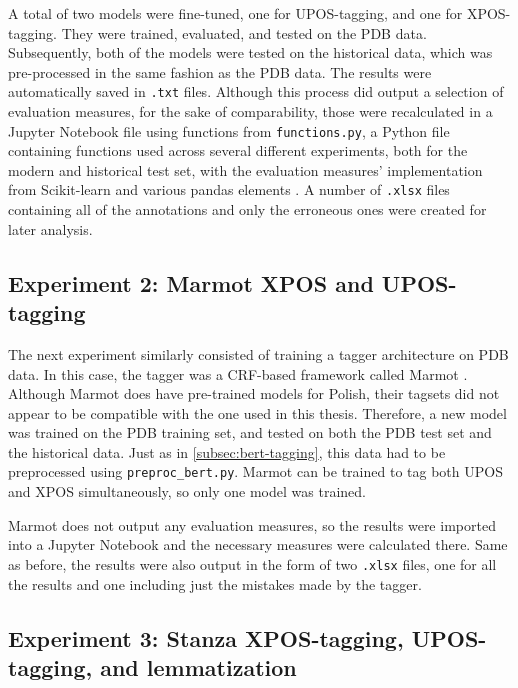 A total of two models were fine-tuned, one for UPOS-tagging, and one for XPOS-tagging. They were trained, evaluated, and tested on the PDB data. Subsequently, both of the models were tested on the historical data, which was pre-processed in the same fashion as the PDB data. The results were automatically saved in \texttt{.txt} files. Although this process did output a selection of evaluation measures, for the sake of comparability, those were recalculated in a Jupyter Notebook file using functions from \texttt{functions.py}, a Python file containing functions used across several different experiments, both for the modern and historical test set, with the evaluation measures' implementation from Scikit-learn and various pandas elements \citep{scikit-learn, reback2020pandas, mckinney-proc-scipy-2010}. A number of \texttt{.xlsx} files containing all of the annotations and only the erroneous ones were created for later analysis.  

\subsection{Experiment 2: Marmot XPOS and UPOS-tagging}
\label{subsec:marmot-tagging}

The next experiment similarly consisted of training a tagger architecture on PDB data. In this case, the tagger was a CRF-based framework called Marmot \citep{mueller-etal-2013-efficient}. Although Marmot does have pre-trained models for Polish, their tagsets did not appear to be compatible with the one used in this thesis. Therefore, a new model was trained on the PDB training set, and tested on both the PDB test set and the historical data. Just as in \autoref{subsec:bert-tagging}, this data had to be preprocessed using \texttt{preproc\_bert.py}. Marmot can be trained to tag both UPOS and XPOS simultaneously, so only one model was trained. 

Marmot does not output any evaluation measures, so the results were imported into a Jupyter Notebook and the necessary measures were calculated there. Same as before, the results were also output in the form of two \texttt{.xlsx} files, one for all the results and one including just the mistakes made by the tagger.

\subsection{Experiment 3: Stanza XPOS-tagging, UPOS-tagging, and lemmatization}
\label{subsec:stanza-tagging}

